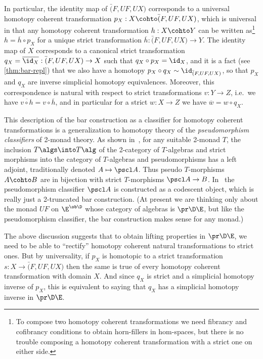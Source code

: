 In particular, the identity map of $\bar(F,UF,UX)$ corresponds to a universal homotopy coherent transformation $p_X:X\cohto \bar(F,UF,UX)$, which is universal in that any homotopy coherent transformation $h:X\cohto Y$ can be written as\footnote{To compose two homotopy coherent transformations we need fibrancy and cofibrancy conditions to obtain horn-fillers in hom-spaces, but there is no trouble composing a homotopy coherent transformation with a strict one on either side.} $h = \overline{h}\circ p_X$ for a unique strict transformation $\overline{h}:\bar(F,UF,UX)\to Y$.
The identity map of $X$ corresponds to a canonical strict transformation $q_X = \overline{\id_X}:\bar(F,UF,UX)\to X$ such that $q_X \circ p_X = \id_X$, and it is a fact (see \cref{thm:bar-repl}) that we also have a homotopy $p_X \circ q_X \sim \id_{\bar(F,UF,UX)}$, so that $p_X$ and $q_X$ are inverse simplicial homotopy equivalences.
Moreover, this correspondence is natural with respect to strict transformations $v:Y\to Z$, i.e.\ we have $\overline{v\circ h} = v\circ \overline{h}$, and in particular for a strict $w:X\to Z$ we have $\overline{w} = w\circ q_X$.

\begin{rmk}\label{rmk:2mnd}
  This description of the bar construction as a classifier for homotopy coherent transformations is a generalization to homotopy theory of the \emph{pseudomorphism classifiers} of 2-monad theory.
  As shown in~\cite{bkp:2dmonads}, for any suitable 2-monad $T$, the inclusion $T\algs \into T\alg$ of the 2-category of $T$-algebras and strict morphisms into the category of $T$-algebras and pseudomorphisms has a left adjoint, traditionally denoted $A \mapsto \pscl A$.
  Thus pseudo $T$-morphisms $A\cohto B$ are in bijection with strict $T$-morphisms $\pscl A\to B$.
  In~\cite{lack:codescent-coh} the pseudomorphism classifier $\pscl A$ is constructed as a codescent object, which is really just a 2-truncated bar construction.
  (At present we are thinking only about the monad $U F$ on $\E^{\ob\D}$ whose category of algebras is $\pr\D\E$, but like the pseudomorphism classifier, the bar construction makes sense for any monad.)
\end{rmk}

The above discussion suggests that to obtain lifting properties in $\pr\D\E$, we need to be able to ``rectify'' homotopy coherent natural transformations to strict ones.
But by universality, if $p_X$ is homotopic to a strict transformation $s:X\to \bar(F,UF,UX)$ then the same is true of every homotopy coherent transformation with domain $X$.
And since $q_X$ is strict and a simplicial homotopy inverse of $p_X$, this is equivalent to saying that $q_X$ has a simplicial homotopy inverse in $\pr\D\E$.

